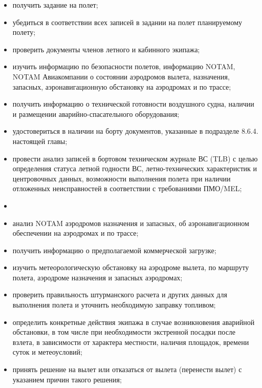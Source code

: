 \begin{itemize}
    \item получить задание на полет;
    \item убедиться в соответствии всех записей в задании на полет планируемому полету;
    \item проверить документы членов летного и кабинного экипажа; 
    \item изучить информацию по безопасности полетов, информацию NOTAM, NOTAM Авиакомпании о состоянии аэродромов вылета, назначения, запасных, аэронавигационную обстановку на аэродромах и по трассе; 
    \item получить информацию о технической готовности воздушного судна, наличии и размещении аварийно-спасательного оборудования; 
    \item удостовериться в наличии на борту документов, указанные в подразделе 8.6.4. настоящей главы;
    \item провести анализ записей в бортовом техническом журнале ВС (TLB) с целью определения статуса летной годности ВС, летно-технических характеристик и центровочных данных, возможности выполнения полета при наличии отложенных неисправностей в соответствии с требованиями ПМО/MEL;
    \item {}
    \item анализ NOTAM аэродромов назначения и запасных, об аэронавигационном обеспечении на аэродромах и по трассе; 
    \item получить информацию о предполагаемой коммерческой загрузке;
    \item изучить метеорологическую обстановку на аэродроме вылета, по маршруту полета, аэродроме назначения и запасных аэродромах;
    \item проверить правильность штурманского расчета и других данных для выполнения полета и уточнить необходимую заправку топливом;
    \item определить конкретные действия экипажа в случае возникновения аварийной обстановки, в том числе при необходимости экстренной посадки после взлета, в зависимости от характера местности, наличия площадок, времени суток и метеоусловий;
    \item принять решение на вылет или отказаться от вылета (перенести вылет) с указанием причин такого решения;

\end{itemize}
